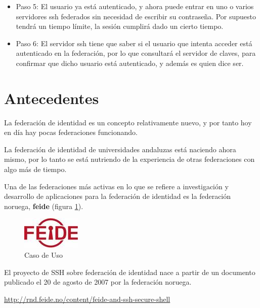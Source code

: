 \begin{itemize}
        \item{Paso 5:} El usuario ya está autenticado, y ahora puede
        entrar en uno o varios servidores ssh federados sin necesidad de
        escribir su contraseña. Por supuesto tendrá un tiempo límite,
        la sesión cumplirá dado un cierto tiempo.

        \item{Paso 6:} El servidor ssh tiene que saber si el usuario
        que intenta acceder está autenticado en la federación, por lo
        que consultará el servidor de claves, para confirmar que dicho
        usuario está autenticado, y además es quien dice ser.

    \end{itemize}


\section{Antecedentes}

    La federación de identidad es un concepto relativamente nuevo, y
    por tanto hoy en día hay pocas federaciones funcionando.

    La federación de identidad de universidades andaluzas está
    naciendo ahora mismo, por lo tanto se está nutriendo de la
    experiencia de otras federaciones con algo más de tiempo.

    Una de las federaciones más activas en lo que se refiere a
    investigación y desarrollo de aplicaciones para la federación de
    identidad es la federación noruega, \textbf{feide} (figura
    \ref{fig:feide}).

    \begin{figure}[htp]
        \centering
            \includegraphics{img/feide.jpg}
            \caption{Caso de Uso}
        \label{fig:feide}
    \end{figure}

    El proyecto de SSH sobre federación de identidad nace a partir de
    un documento publicado el 20 de agosto de 2007 por la federación
    noruega.

    \href{http://rnd.feide.no/content/feide-and-ssh-secure-shell}{http://rnd.feide.no/content/feide-and-ssh-secure-shell}

